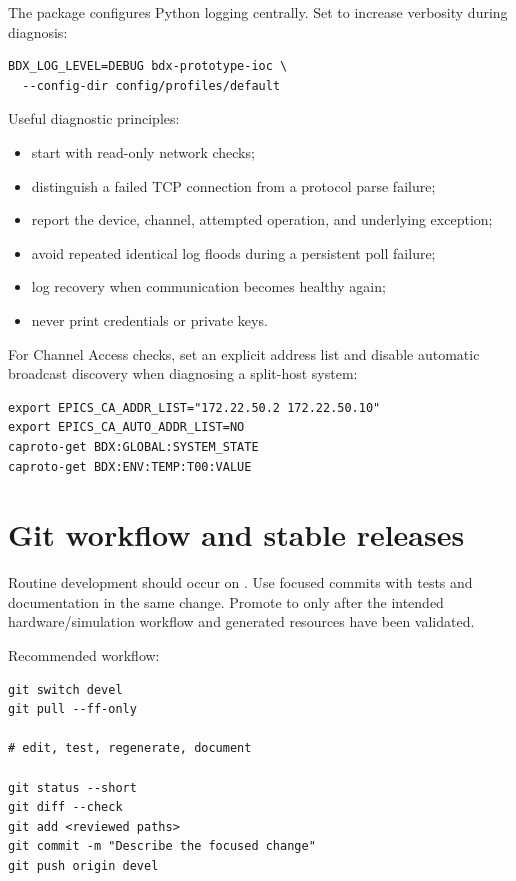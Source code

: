 The package configures Python logging centrally. Set  to increase verbosity during diagnosis:

\begin{lstlisting}[style=shell]
BDX_LOG_LEVEL=DEBUG bdx-prototype-ioc \
  --config-dir config/profiles/default
\end{lstlisting}

Useful diagnostic principles:

\begin{itemize}
  \item start with read-only network checks;
  \item distinguish a failed TCP connection from a protocol parse failure;
  \item report the device, channel, attempted operation, and underlying exception;
  \item avoid repeated identical log floods during a persistent poll failure;
  \item log recovery when communication becomes healthy again;
  \item never print credentials or private keys.
\end{itemize}

For Channel Access checks, set an explicit address list and disable automatic broadcast discovery when diagnosing a split-host system:

\begin{lstlisting}[style=shell]
export EPICS_CA_ADDR_LIST="172.22.50.2 172.22.50.10"
export EPICS_CA_AUTO_ADDR_LIST=NO
caproto-get BDX:GLOBAL:SYSTEM_STATE
caproto-get BDX:ENV:TEMP:T00:VALUE
\end{lstlisting}

\section{Git workflow and stable releases}

Routine development should occur on . Use focused commits with tests and documentation in the same change. Promote to  only after the intended hardware/simulation workflow and generated resources have been validated.

Recommended workflow:

\begin{lstlisting}[style=shell]
git switch devel
git pull --ff-only

# edit, test, regenerate, document

git status --short
git diff --check
git add <reviewed paths>
git commit -m "Describe the focused change"
git push origin devel
\end{lstlisting}

